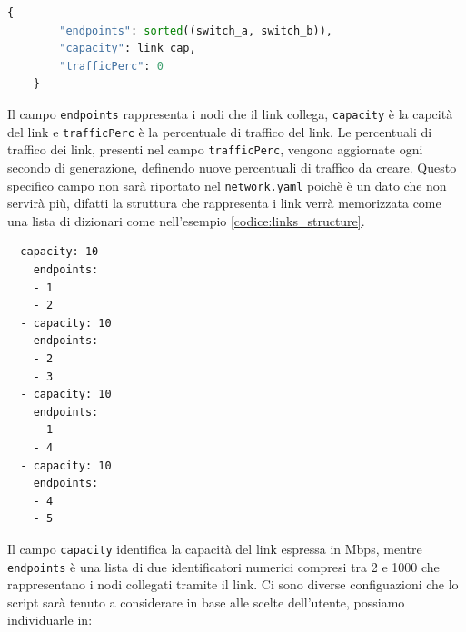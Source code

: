 \documentclass[binding=0.6cm]{sapthesis}
\begin{document}
{\scriptsize %
\begin{lstlisting}[language=Python, caption={Esempio di rappresentazione di un link}, label={codice:links_key_value}]
    {
        "endpoints": sorted((switch_a, switch_b)),
        "capacity": link_cap,
        "trafficPerc": 0
    }
\end{lstlisting}
}
Il campo \texttt{endpoints} rappresenta i nodi che il link collega, \texttt{capacity} è la capcità del link e \texttt{trafficPerc} è la percentuale di traffico del link.
Le percentuali di traffico dei link, presenti nel campo \texttt{trafficPerc}, vengono aggiornate ogni secondo di generazione, definendo nuove percentuali di traffico da creare.
Questo specifico campo non sarà riportato nel \texttt{network.yaml}
poichè è un dato che non servirà più, difatti la struttura che rappresenta i link verrà memorizzata come una lista di dizionari come nell'esempio \ref{codice:links_structure}.


{\scriptsize %
\begin{lstlisting}[caption={Esempio di struttura finale dei links}, label={codice:links_structure}]
  - capacity: 10
    endpoints:
    - 1
    - 2
  - capacity: 10
    endpoints:
    - 2
    - 3
  - capacity: 10
    endpoints:
    - 1
    - 4
  - capacity: 10
    endpoints:
    - 4
    - 5
\end{lstlisting}
}

Il campo \texttt{capacity} identifica la capacità del link espressa in Mbps, mentre \texttt{endpoints} è una lista di due identificatori numerici compresi tra
2 e 1000 che rappresentano i nodi collegati tramite il link.
Ci sono diverse configuazioni che lo script sarà tenuto a considerare in base alle scelte dell'utente, possiamo individuarle in:
\end{document}
